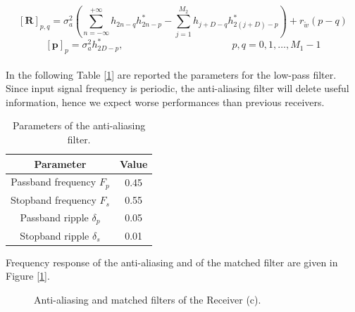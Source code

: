\documentclass[a4paper, 12pt]{report}
\begin{document}
\begin{equation}
\mathbf{[R]}_{p,q} = \sigma_a^2 \left( \sum_{n=-\infty}^{+\infty}h_{2n-q}h^*_{2n-p}-\sum_{j=1}^{M_2}h_{j+D-q}h^*_{2(j+D)-p} \right) + r_{\tilde{w}}(p-q)
\end{equation}
\begin{equation}
\mathbf{[p]}_p = \sigma_a^2 h^*_{2D-p}, \quad\quad\quad\quad\quad\quad\quad\quad\quad\quad\quad p,q = 0,1,\dots,M_1-1
\end{equation}
\\
In the following Table [\ref{gaa}] are reported the parameters for the low-pass filter.\\
Since input signal frequency is periodic, the anti-aliasing filter will delete useful information, hence we expect worse performances than previous receivers.

\begin{table}[H]
	\centering
	\begin{tabular}{c | c}
		\toprule
		Parameter & Value \\
		\midrule
		Passband frequency $F_{p}$ & 0.45\\
		Stopband frequency $F_{s}$ & 0.55\\
		Passband ripple $\delta_{p}$ & 0.05\\
		Stopband ripple $\delta_{s}$ & 0.01\\
		\bottomrule			
	\end{tabular}
	\caption{Parameters of the anti-aliasing filter.}
	\label{gaa}
\end{table}

Frequency response of the anti-aliasing and of the matched filter are given in Figure [\ref{filters_c}].

\begin{figure}[H]
	\centering
	\caption{Anti-aliasing and matched filters of the Receiver (c).}\label{filters_c}
\end{figure}
\end{document}
